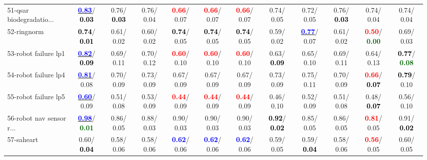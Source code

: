 \begin{table}[h]
\begin{center}
{\begin{tabular}{lc|c|c|c|c|c|c|c|c|c|c}
51-qsar biodegradatio... & \underline{\textcolor{blue}{\textbf{  0.83}}}/\textcolor{black}{\textbf{  0.03}} &   0.76/\textcolor{black}{\textbf{  0.03}} &   0.76/  0.04 & \textcolor{red}{\textbf{  0.66}}/  0.07 & \textcolor{red}{\textbf{  0.66}}/  0.07 & \textcolor{red}{\textbf{  0.66}}/  0.07 &   0.74/  0.05 &   0.72/  0.05 &   0.76/\textcolor{black}{\textbf{  0.03}} &   0.74/  0.04 &   0.74/  0.04 \\
52-ringnorm & \textcolor{black}{\textbf{  0.74}}/\textcolor{black}{\textbf{  0.01}} &   0.61/  0.02 &   0.60/  0.02 & \textcolor{black}{\textbf{  0.74}}/  0.05 & \textcolor{black}{\textbf{  0.74}}/  0.05 & \textcolor{black}{\textbf{  0.74}}/  0.05 &   0.59/  0.02 & \underline{\textcolor{blue}{\textbf{  0.77}}}/  0.07 &   0.61/  0.02 & \textcolor{red}{\textbf{  0.50}}/\textcolor{darkgreen}{\textbf{  0.00}} &   0.69/  0.03 \\
53-robot failure lp1 & \underline{\textcolor{blue}{\textbf{  0.82}}}/\textcolor{black}{\textbf{  0.09}} &   0.69/  0.11 &   0.70/  0.12 & \textcolor{red}{\textbf{  0.60}}/  0.10 & \textcolor{red}{\textbf{  0.60}}/  0.10 & \textcolor{red}{\textbf{  0.60}}/  0.10 &   0.63/\textcolor{black}{\textbf{  0.09}} &   0.65/  0.10 &   0.69/  0.11 &   0.64/  0.13 & \textcolor{black}{\textbf{  0.77}}/\textcolor{darkgreen}{\textbf{  0.08}} \\ \hline
54-robot failure lp4 & \underline{\textcolor{blue}{\textbf{  0.81}}}/  0.08 &   0.70/  0.09 &   0.73/  0.09 &   0.67/  0.09 &   0.67/  0.09 &   0.67/  0.09 &   0.73/  0.09 &   0.75/  0.11 &   0.70/  0.09 & \textcolor{red}{\textbf{  0.66}}/\textcolor{black}{\textbf{  0.07}} & \textcolor{black}{\textbf{  0.79}}/  0.10 \\
55-robot failure lp5 & \underline{\textcolor{blue}{\textbf{  0.60}}}/  0.09 &   0.51/  0.08 &   0.53/  0.09 & \textcolor{red}{\textbf{  0.44}}/  0.09 & \textcolor{red}{\textbf{  0.44}}/  0.09 & \textcolor{red}{\textbf{  0.44}}/  0.09 &   0.46/  0.10 &   0.52/  0.09 &   0.51/  0.08 &   0.48/\textcolor{black}{\textbf{  0.07}} &   0.56/  0.10 \\
56-robot nav sensor r... & \underline{\textcolor{blue}{\textbf{  0.98}}}/\textcolor{darkgreen}{\textbf{  0.01}} &   0.86/  0.05 &   0.88/  0.03 &   0.90/  0.03 &   0.90/  0.03 &   0.90/  0.03 & \textcolor{black}{\textbf{  0.92}}/\textcolor{black}{\textbf{  0.02}} &   0.85/  0.05 &   0.86/  0.05 & \textcolor{red}{\textbf{  0.81}}/  0.05 &   0.91/\textcolor{black}{\textbf{  0.02}} \\
57-saheart &   0.60/\textcolor{black}{\textbf{  0.04}} &   0.58/  0.06 &   0.58/  0.06 & \textcolor{blue}{\textbf{  0.62}}/  0.06 & \textcolor{blue}{\textbf{  0.62}}/  0.06 & \textcolor{blue}{\textbf{  0.62}}/  0.06 &   0.59/  0.05 &   0.59/\textcolor{black}{\textbf{  0.04}} &   0.58/  0.06 & \textcolor{red}{\textbf{  0.56}}/  0.05 &   0.60/  0.05 \\

\end{tabular}}
\end{center}
\end{table}
